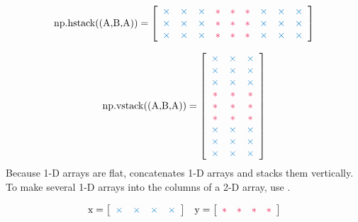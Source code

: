 \begin{align*}
\text{\li{np.hstack((A,B,A))}} =
\left[\begin{array}{ccccccccc}
\textcolor{blue}{\times}&\textcolor{blue}{\times}&\textcolor{blue}{\times}&
\textcolor{red}{*} & \textcolor{red}{*} & \textcolor{red}{*}&
\textcolor{blue}{\times}&\textcolor{blue}{\times}&\textcolor{blue}{\times}\\
\textcolor{blue}{\times}&\textcolor{blue}{\times}&\textcolor{blue}{\times}&
\textcolor{red}{*} & \textcolor{red}{*} & \textcolor{red}{*}&
\textcolor{blue}{\times}&\textcolor{blue}{\times}&\textcolor{blue}{\times}\\
\textcolor{blue}{\times}&\textcolor{blue}{\times}&\textcolor{blue}{\times}&
\textcolor{red}{*} & \textcolor{red}{*} & \textcolor{red}{*}&
\textcolor{blue}{\times}&\textcolor{blue}{\times}&\textcolor{blue}{\times}
\end{array}\right]
\end{align*}

\begin{align*}
\text{\li{np.vstack((A,B,A))}} =
\left[\begin{array}{ccc}
\textcolor{blue}{\times}&\textcolor{blue}{\times}&\textcolor{blue}{\times}\\
\textcolor{blue}{\times}&\textcolor{blue}{\times}&\textcolor{blue}{\times}\\
\textcolor{blue}{\times}&\textcolor{blue}{\times}&\textcolor{blue}{\times}\\
\textcolor{red}{*} & \textcolor{red}{*} & \textcolor{red}{*} \\
\textcolor{red}{*} & \textcolor{red}{*} & \textcolor{red}{*} \\
\textcolor{red}{*} & \textcolor{red}{*} & \textcolor{red}{*} \\
\textcolor{blue}{\times}&\textcolor{blue}{\times}&\textcolor{blue}{\times}\\
\textcolor{blue}{\times}&\textcolor{blue}{\times}&\textcolor{blue}{\times}\\
\textcolor{blue}{\times}&\textcolor{blue}{\times}&\textcolor{blue}{\times}
\end{array}\right]
\end{align*}
Because 1-D arrays are flat,  concatenates 1-D arrays and  stacks them vertically.
To make several 1-D arrays into the columns of a 2-D array, use .

\begin{align*}
\text{\li{x}} = \left[\begin{array}{cccc}
\textcolor{blue}{\times}&\textcolor{blue}{\times}&\textcolor{blue}{\times}&\textcolor{blue}{\times}
\end{array}\right]
&&
\text{\li{y}} = \left[\begin{array}{cccc}
\textcolor{red}{*}&\textcolor{red}{*}&\textcolor{red}{*}&\textcolor{red}{*}\end{array}\right]
\end{align*}

